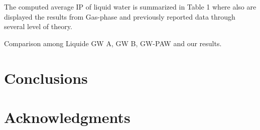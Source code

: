 \documentclass[12pt,a4paper]{article}
\begin{document}
The computed average IP of liquid water is summarized in Table 1 where also are displayed the results
from Gas-phase and previously reported data through several level of theory. 


Comparison among Liquide GW A, GW B, GW-PAW and our results. 


\section{Conclusions}

\nocite{*}

\printbibliography

\section{Acknowledgments}
\end{document}
